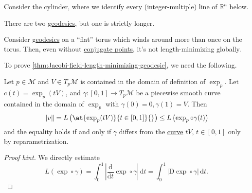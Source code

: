 \begin{eg}[Cylinder]
	Consider the cylinder, where we identify every (integer-multiple) line of \(\mathbb{R} ^n\) below.
	\begin{center}
	\end{center}
	There are two \hyperref[def:geodesic]{geodesics}, but one is strictly longer.
\end{eg}

\begin{eg}[Torus]
	Consider \hyperref[def:geodesic]{geodesics} on a ``flat'' torus which winds around more than once on the torus. Then, even without \hyperref[def:conjugate-point]{conjugate points}, it's not length-minimizing globally.
\end{eg}

To prove \autoref{thm:Jacobi-field-length-minimizing-geodesic}, we need the following.

\begin{corollary}\label{col:lec18}
	Let \(p\in \mathcal{M} \) and \(V\in T_p \mathcal{M} \) is contained in the domain of definition of \(\exp _p\). Let \(c(t) = \exp _p(t V)\), and \(\gamma \colon [0, 1] \to T_p \mathcal{M} \) be a piecewise \hyperref[def:curve]{smooth curve}  contained in the domain of \(\exp _p\) with \(\gamma (0) = 0, \gamma (1) = V\). Then
	\[
		\lVert v \rVert
		= L \left( \at{\exp _p(tV)}{t\in[0, 1]}{}  \right)
		\leq L \left( \exp _p \circ \gamma (t) \right)
	\]
	and the equality holds if and only if \(\gamma \) differs from the \hyperref[def:curve]{curve} \(tV\), \(t\in[0, 1]\) only by reparametrization.
\end{corollary}
\begin{proof}[Proof hint]
	We directly estimate
	\[
		L(\exp \circ \gamma )
		= \int_{0}^{1} \left\vert \frac{\mathrm{d}}{\mathrm{d}t} \exp \circ \gamma \right\vert \,\mathrm{d}t
		= \int_{0}^{1} \vert \mathrm{D} \exp \circ \gamma  \vert  \,\mathrm{d}t.
	\]
\end{proof}